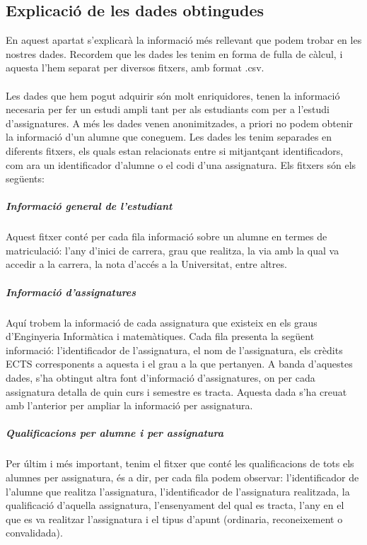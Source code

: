\documentclass[12pt,a4paper,catalan]{article}
\begin{document}
\newpage

\subsection{Explicació de les dades obtingudes}
\label{subsec:explicaciodadesobtingudes} 
En aquest apartat s'explicarà la informació més rellevant que podem trobar en les nostres dades. Recordem que les dades les tenim en forma de fulla de càlcul, i aquesta l'hem separat per diversos fitxers, amb format .csv.
\\
\\
Les dades que hem pogut adquirir són molt enriquidores, tenen la informació necesaria per fer un estudi ampli tant per als estudiants com per a l'estudi d'assignatures. A més les dades venen anonimitzades, a priori no podem obtenir la informació d'un alumne que coneguem. Les dades les tenim separades en diferents fitxers, els quals estan relacionats entre si mitjantçant identificadors, com ara un identificador d'alumne o el codi d'una assignatura. Els fitxers són els següents:

\subparagraph{Informació general de l'estudiant}
Aquest fitxer conté per cada fila informació sobre un alumne en termes de matriculació: l'any d'inici de carrera, grau que realitza, la via amb la qual va accedir a la carrera, la nota d'accés a la Universitat, entre altres.

\subparagraph{Informació d'assignatures}
Aquí trobem la informació de cada assignatura que existeix en els graus d'Enginyeria Informàtica i matemàtiques. Cada fila presenta la següent informació: l'identificador de l'assignatura, el nom de l'assignatura, els crèdits ECTS corresponents a aquesta i el grau a la que pertanyen. A banda d'aquestes dades, s'ha obtingut altra font d'informació d'assignatures, on per cada assignatura detalla de quin curs i semestre es tracta. Aquesta dada s'ha creuat amb l'anterior per ampliar la informació per assignatura.

\subparagraph{Qualificacions per alumne i per assignatura}
Per últim i més important, tenim el fitxer que conté les qualificacions de tots els alumnes per assignatura, és a dir, per cada fila podem observar: l'identificador de l'alumne que realitza l'assignatura, l'identificador de l'assignatura realitzada, la qualificació d'aquella assignatura, l'ensenyament del qual es tracta, l'any en el que es va realitzar l'assignatura i el tipus d'apunt (ordinaria, reconeixement o convalidada).

\newpage
\end{document}
